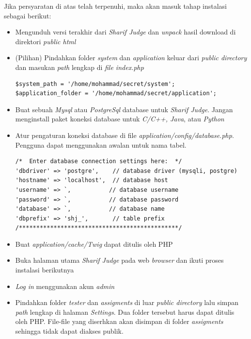 \documentclass[a4paper,twoside]{article}
\begin{document}
\begin{enumerate}
\begin{enumerate}
			
			Jika persyaratan di atas telah terpenuhi, maka akan masuk tahap instalasi sebagai berikut:
			\begin{itemize}
				\item Mengunduh versi terakhir dari \textit{Sharif Judge} dan \textit{unpack} hasil download di direktori \textit{public html}
				\item (Pilihan) Pindahkan folder \textit{system} dan \textit{application} keluar dari \textit{public directory} dan
				masukan \textit{path} lengkap di \textit{file index.php} 
				\begin{lstlisting}[backgroundcolor = \color{lightgray}]
$system_path = '/home/mohammad/secret/system';
$application_folder = '/home/mohammad/secret/application';				
				\end{lstlisting}
				\item Buat sebuah \textit{Mysql} atau \textit{PostgreSql} database untuk \textit{Sharif Judge}. Jangan menginstall paket koneksi database untuk \textit{C/C++, Java}, atau \textit{Python}
				\item Atur pengaturan koneksi database di file \textit{application/config/database.php}. Pengguna dapat menggunakan awalan untuk nama tabel.
				\begin{lstlisting}[backgroundcolor = \color{lightgray}]
/*  Enter database connection settings here:  */
'dbdriver' => 'postgre',    // database driver (mysqli, postgre)
'hostname' => 'localhost',  // database host
'username' => `,           // database username
'password' => `,           // database password
'database' => `,           // database name
'dbprefix' => 'shj_',       // table prefix
/**********************************************/				
				\end{lstlisting}
				\item Buat \textit{application/cache/Twig} dapat ditulis oleh PHP
				\item Buka halaman utama \textit{Sharif Judge} pada web \textit{browser} dan ikuti proses instalasi berikutnya
				\item \textit{Log in} menggunakan akun \textit{admin}
				\item Pindahkan folder \textit{tester} dan \textit{assigments} di luar \textit{public directory} lalu simpan \textit{path} lengkap di halaman \textit{Settings}. Dua folder tersebut harus dapat ditulis oleh PHP. File-file yang diserhkan akan disimpan di folder \textit{assigments} sehingga tidak dapat diakses publik.
			\end{itemize}
			

\end{enumerate}
\end{enumerate}
\end{document}
